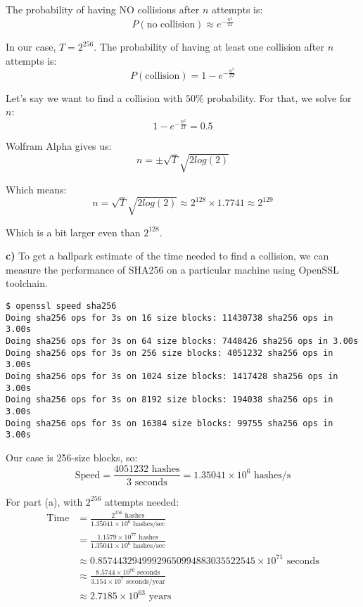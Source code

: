 The probability of having NO collisions after $n$ attempts is:
\begin{equation}
    P(\text{no collision}) \approx e^{-\frac{n^2}{2T}}
\end{equation}

In our case, $T = 2^{256}$.
The probability of having at least one collision after $n$ attempts is:
\[ P(\text{collision}) = 1 - e^{-\frac{n^2}{2T}} \]

Let's say we want to find a collision with $50\%$ probability.
For that, we solve for $n$:
\begin{equation}
    1 - e^{-\frac{n^2}{2T}} = 0.5
\end{equation}

Wolfram Alpha gives us:
\begin{equation}
    n = \pm \sqrt{T} \sqrt{2 log(2)}
\end{equation}

Which means:
\begin{equation}
    n = \sqrt{T} \sqrt{2 log(2)} \approx 2^{128} \times 1.7741 \approx 2^{129}
\end{equation}

Which is a bit larger even than $2^{128}$.

\textbf{c)} To get a ballpark estimate of the time needed to find a collision, we can measure the performance of SHA256 on a particular machine using OpenSSL toolchain.

\begin{verbatim}
$ openssl speed sha256
Doing sha256 ops for 3s on 16 size blocks: 11430738 sha256 ops in 3.00s
Doing sha256 ops for 3s on 64 size blocks: 7448426 sha256 ops in 3.00s
Doing sha256 ops for 3s on 256 size blocks: 4051232 sha256 ops in 3.00s
Doing sha256 ops for 3s on 1024 size blocks: 1417428 sha256 ops in 3.00s
Doing sha256 ops for 3s on 8192 size blocks: 194038 sha256 ops in 3.00s
Doing sha256 ops for 3s on 16384 size blocks: 99755 sha256 ops in 3.00s
\end{verbatim}

Our case is 256-size blocks, so:
\[ \text{Speed} = \frac{4051232 \text{ hashes}}{3 \text{ seconds}} = 1.35041 \times 10^6 \text{ hashes/s} \]

For part (a), with $2^{256}$ attempts needed:
\begin{align*}
    \text{Time} &= \frac{2^{256} \text{ hashes}}{1.35041 \times 10^6 \text{ hashes/sec}} \\
    &= \frac{1.1579 \times 10^{77} \text{ hashes}}{1.35041 \times 10^6 \text{ hashes/sec}} \\
    &\approx 0.85744329499929650994883035522545 \times 10^{71} \text{ seconds} \\
    &\approx \frac{8.5744 \times 10^{70} \text{ seconds}}{3.154 \times 10^7 \text{ seconds/year}} \\
    &\approx 2.7185 \times 10^{63} \text{ years}
\end{align*}

